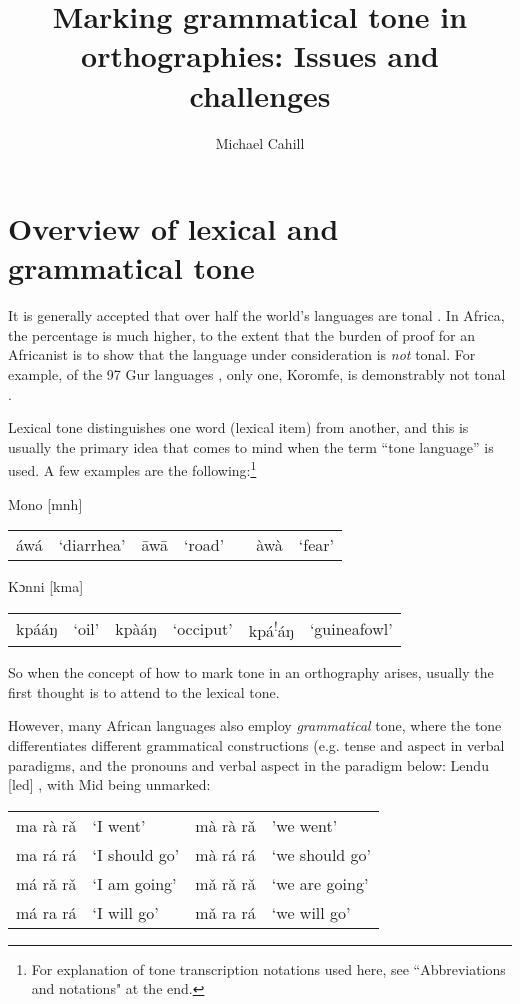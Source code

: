 \documentclass[output=paper]{langscibook}
\author{Michael Cahill\affiliation{SIL International}}
\title{Marking grammatical tone in orthographies: Issues and challenges}
\begin{document}
\maketitle

\section{Overview of lexical and grammatical tone}\label{sec:cahill:1}

It is generally accepted that over half the world’s languages are tonal \citep{Yip2002}. In Africa, the percentage is much higher, to the extent that the burden of proof for an Africanist is to show that the language under consideration is \textit{not} tonal. For example, of the 97 Gur languages \citep{Ethnologue2020}, only one, Koromfe, is demonstrably not tonal \citep{Rennison1997}.  

Lexical tone distinguishes one word (lexical item) from another, and this is usually the primary idea that comes to mind when the term “tone language” is used. A few examples are the following:\footnote{For explanation of tone transcription notations used here, see ``Abbreviations and notations" at the end.}

\ea 
Mono [mnh] \citep{Olson2005}

\begin{tabular}{@{}llrclrl@{}} 
 áwá & ‘diarrhea’ & āwā & ‘road’ &  & àwà & ‘fear’ \\ 
\end{tabular}
\ex 
Kɔnni [kma] \citep{Cahill2007}

\begin{tabular}{@{}llrlrc@{}} 
 kpááŋ & ‘oil’ & kpàáŋ & ‘occiput’ & kpá\textsuperscript{!}áŋ  & ‘guineafowl’  \\ 
\end{tabular}
\z
So when the concept of how to mark tone in an orthography arises, usually the first thought is to attend to the lexical tone.


However, many African languages also employ \textit{grammatical} tone, where the tone differentiates different grammatical constructions (e.g. tense and aspect in verbal paradigms, and the pronouns and verbal aspect in the paradigm below: 
\ea 
 Lendu [led] \citep[64]{KutschLojenga2014}, with Mid being unmarked:
 
\begin{tabular}{@{}llll@{}}
 ma rà rǎ  &	‘I went’ & mà rà rǎ  &'we went’  \\ 
 ma rá rá &	‘I should go’ &	mà rá rá & ‘we should go’ \\
 má rǎ rǎ & ‘I am going’	& mǎ rǎ rǎ & ‘we are going’\\
 má ra rá &	‘I will go’ & mǎ ra rá & ‘we will go’\\
\end{tabular}
\z
\end{document}

